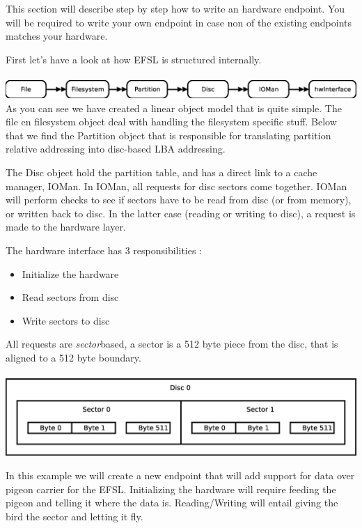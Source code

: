 \label{hwdriver}
This section will describe step by step how to write an hardware endpoint.
You will be required to write your own endpoint in case non of the existing endpoints
matches your hardware.

First let's have a look at how EFSL is structured internally.\\\\
\includegraphics[scale=0.4]{schematics/objectmodel.eps}\\

As you can see we have created a linear object model that is quite simple.
The file en filesystem object deal with handling the filesystem specific stuff.
Below that we find the Partition object that is responsible for translating partition
relative addressing into disc-based LBA addressing.

The Disc object hold the partition table, and has a direct link to a cache manager, IOMan.
In IOMan, all requests for disc sectors come together. IOMan will perform checks to see
if sectors have to be read from disc (or from memory), or written back to disc.
In the latter case (reading or writing to disc), a request is made to the hardware layer.

The hardware interface has 3 responsibilities :
\begin{itemize}
	\item Initialize the hardware
	\item Read sectors from disc
	\item Write sectors to disc
\end{itemize}

All requests are \textsl{sector}based, a sector is a 512 byte piece from the disc, that is aligned to
a 512 byte boundary.\\\\
\includegraphics[scale=0.4]{schematics/sector.eps}

In this example we will create a new endpoint that will add support for data over pigeon carrier
for the EFSL. Initializing the hardware will require feeding the pigeon and telling it where the
data is. Reading/Writing will entail giving the bird the sector and letting it fly.

